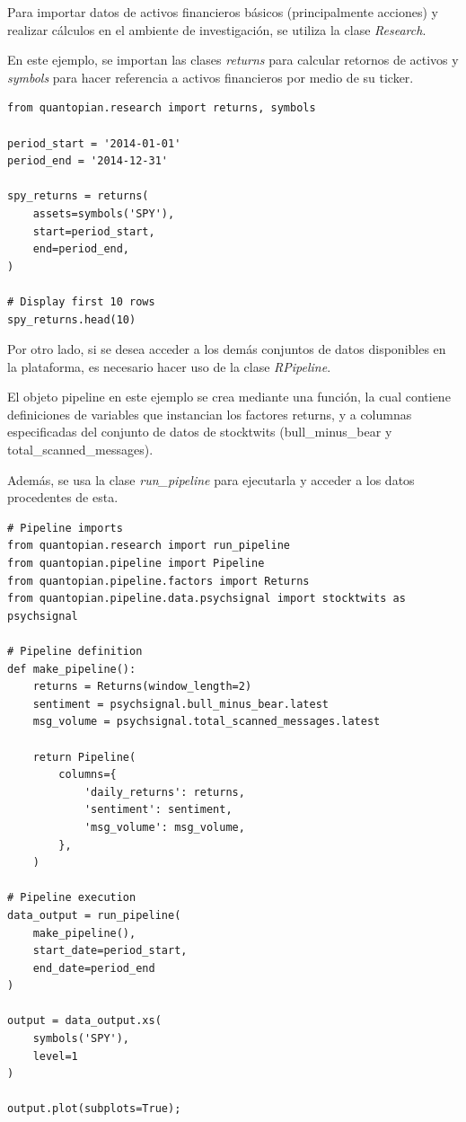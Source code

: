 \documentclass[a4paper, 11pt, twocolumn]{article}
\begin{document}
Para importar datos de activos financieros básicos (principalmente acciones) y realizar cálculos en el ambiente de investigación, se utiliza la clase \textit{Research}.

En este ejemplo, se importan las clases \textit{returns} para calcular retornos de activos y \textit{symbols} para hacer referencia a activos financieros por medio de su ticker.



\lstset{columns=fullflexible, xleftmargin=1cm, basicstyle=\footnotesize, language=Python, breaklines=true, numbers=left} 
\begin{lstlisting}
from quantopian.research import returns, symbols

period_start = '2014-01-01'
period_end = '2014-12-31'

spy_returns = returns(
    assets=symbols('SPY'),
    start=period_start,
    end=period_end,
)

# Display first 10 rows
spy_returns.head(10)
\end{lstlisting}

Por otro lado, si se desea acceder a los demás conjuntos de datos disponibles en la plataforma, es necesario hacer uso de la clase \textit{RPipeline}.

El objeto pipeline en este ejemplo se crea mediante una función, la cual contiene definiciones de variables que instancian los factores returns, y a columnas especificadas del conjunto de datos de stocktwits (bull\_minus\_bear y total\_scanned\_messages).

Además, se usa la clase \textit{run\_pipeline} para ejecutarla y acceder a los datos procedentes de esta.

\begin{lstlisting}
# Pipeline imports
from quantopian.research import run_pipeline
from quantopian.pipeline import Pipeline
from quantopian.pipeline.factors import Returns
from quantopian.pipeline.data.psychsignal import stocktwits as psychsignal

# Pipeline definition
def make_pipeline():
    returns = Returns(window_length=2)
    sentiment = psychsignal.bull_minus_bear.latest
    msg_volume = psychsignal.total_scanned_messages.latest

    return Pipeline(
        columns={
            'daily_returns': returns,
            'sentiment': sentiment,
            'msg_volume': msg_volume,
        },
    )

# Pipeline execution
data_output = run_pipeline(
    make_pipeline(),
    start_date=period_start,
    end_date=period_end
)

output = data_output.xs(
    symbols('SPY'),
    level=1
)

output.plot(subplots=True);
\end{lstlisting}
\end{document}
